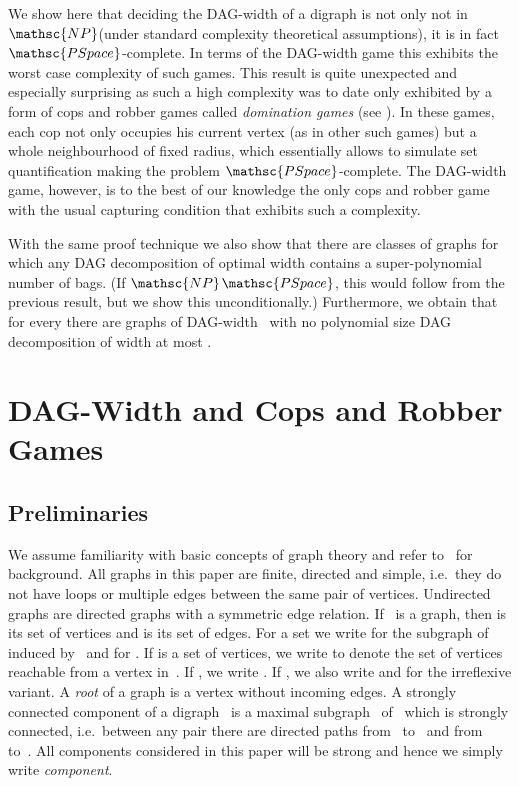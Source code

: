 \documentclass[authoryear]{article}
\makeatletter
\theoremstyle{definition}
\newcommand{\0}{\emptyset}
\newcommand{\np}{\ensuremath{\mathsc{NP}}\xspace}
\newcommand{\pspace}{\ensuremath{\mathsc{PSpace}}\xspace}
\newcommand{\dagw}{DAG-{}width\xspace}
\newcommand{\ie}{i.e.\@\xspace}
\makeatother
\begin{document}
We show here that deciding the \dagw of a
digraph is not only not in \np (under standard complexity theoretical
assumptions), it is in fact \pspace-complete. In terms of the \dagw
game this exhibits the worst case complexity of such games. This
result is quite unexpected and especially surprising as such a high
complexity was to date only exhibited by a form of cops and robber
games called \emph{domination games} (see
\cite{FominKM03,FominGT11,KreutzerOrd09}). In these games, each cop
not only occupies his current vertex (as in other such games) but a whole neighbourhood of
fixed radius, which essentially allows to simulate set quantification
making the problem \pspace-complete.
The \dagw game, however, is to the best of our
knowledge the only cops and robber game with the usual
capturing condition that exhibits such a complexity.

With the same proof technique we also show that there are classes of
graphs for which any DAG decomposition of optimal width contains a
super-polynomial number of bags. (If \np\pspace, this would
follow from the previous result, but we show this unconditionally.)
Furthermore, we obtain that for every  there are
graphs of DAG-width~ with no polynomial size DAG decomposition
of width at most .



\section{DAG-Width and Cops and Robber Games}
\label{sec:prelims}

\subsection{Preliminaries}
We assume familiarity with basic concepts of graph theory and refer
to~\cite{Diestel12} for background.  All graphs in this paper are
finite, directed and simple, i.e.~they do not have loops or multiple
edges between the same pair of vertices. Undirected graphs are
directed graphs with a symmetric edge relation.  If~ is a graph,
then  is its set of vertices and  is its set of edges. For
a set  we write  for the subgraph of~
induced by~ and  for . If  is a set of
vertices, we write  to denote the set of vertices
reachable from a vertex in~. If , we write
. If , we also write  and 
for the irreflexive variant. A \emph{root} of a graph is a vertex
without incoming edges.
A strongly connected component of a digraph~ is a maximal
subgraph~ of~ which is strongly connected, \ie~between any pair
 there are directed paths from~ to~ and from~
to~. All components considered in this paper will be strong and
hence we simply write \emph{component}.  
\end{document}
